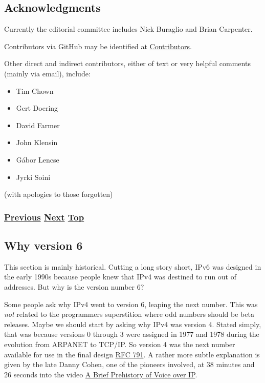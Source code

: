 \documentclass[
]{article}
\begin{document}
\pagebreak

\subsection{Acknowledgments}\label{acknowledgments}

Currently the editorial committee includes Nick Buraglio and Brian
Carpenter.

Contributors via GitHub may be identified at
\href{https://github.com/becarpenter/book6/graphs/contributors}{Contributors}.

Other direct and indirect contributors, either of text or very helpful
comments (mainly via email), include:

\begin{itemize}
\item
  Tim Chown
\item
  Gert Doering
\item
  David Farmer
\item
  John Klensin
\item
  Gábor Lencse
\item
  Jyrki Soini
\end{itemize}

(with apologies to those forgotten)

\subsubsection{\texorpdfstring{\hyperref[how-to-contribute]{Previous}
\hyperref[why-version-6]{Next}
\hyperref[introduction-and-foreword]{Top}}{Previous Next Top}}\label{previous-next-top-6}

\pagebreak

\subsection{Why version 6}\label{why-version-6}

This section is mainly historical. Cutting a long story short, IPv6 was
designed in the early 1990s because people knew that IPv4 was destined
to run out of addresses. But why is the version number 6?

Some people ask why IPv4 went to version 6, leaping the next number.
This was \emph{not} related to the programmer\textquotesingle s
superstition where odd numbers should be beta releases. Maybe we should
start by asking why IPv4 was version 4. Stated simply, that was because
versions 0 through 3 were assigned in 1977 and 1978 during the evolution
from ARPANET to TCP/IP. So version 4 was the next number available for
use in the final design
\href{https://www.rfc-editor.org/info/rfc791}{RFC 791}. A rather more
subtle explanation is given by the late Danny Cohen, one of the pioneers
involved, at 38 minutes and 26 seconds into the video
\href{http://www.securitytube.net/video/1978}{A Brief Prehistory of
Voice over IP}.
\end{document}
